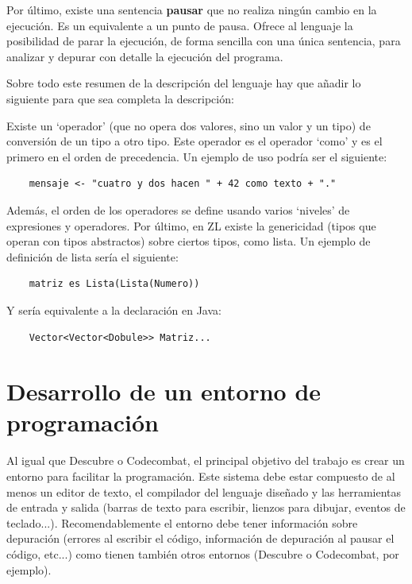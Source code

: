 \documentclass{report}
\begin{document}
	\vspace{10px}

	Por último, existe una sentencia \textbf{pausar} que no realiza ningún cambio en la ejecución. Es un equivalente a un punto de pausa. Ofrece al lenguaje la posibilidad de parar la ejecución, de forma sencilla con una única sentencia, para analizar y depurar con detalle la ejecución del programa.
	
	\vspace{10px}
	
	Sobre todo este resumen de la descripción del lenguaje hay que añadir lo siguiente para que sea completa la descripción:
	
		
	\noindent Existe un `operador' (que no opera dos valores, sino un valor y un tipo) de conversión de un tipo a otro tipo. Este operador es el operador `como' y es el primero en el orden de precedencia. Un ejemplo de uso podría ser el siguiente:
	
	\begin{BVerbatim}
	mensaje <- "cuatro y dos hacen " + 42 como texto + "."
	\end{BVerbatim} 
	
	Además, el orden de los operadores se define usando varios `niveles' de expresiones y operadores.
	Por último, en ZL existe la genericidad (tipos que operan con tipos abstractos) sobre ciertos tipos, como lista. Un ejemplo de definición de lista sería el siguiente:
	
\begin{BVerbatim}
	matriz es Lista(Lista(Numero))
\end{BVerbatim}

	Y sería equivalente a la declaración en Java:
	
	\begin{BVerbatim}
	Vector<Vector<Dobule>> Matriz...
	\end{BVerbatim}
	

	\section{Desarrollo de un entorno de programación}
	
	Al igual que Descubre o Codecombat, el principal objetivo del trabajo es crear un entorno para facilitar la programación. Este sistema debe estar compuesto de al menos un editor de texto, el compilador del lenguaje diseñado y las herramientas de entrada y salida (barras de texto para escribir, lienzos para dibujar, eventos de teclado...). Recomendablemente el entorno debe tener información sobre depuración (errores al escribir el código, información de depuración al pausar el código, etc...) como tienen también otros entornos (Descubre o Codecombat, por ejemplo).
	
\end{document}
